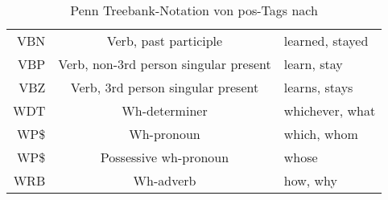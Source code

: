 \begin{table}[h]
\begin{tabular}{ r c l }
    VBN & Verb, past participle & learned, stayed \\
    VBP & Verb, non-3rd person singular present & learn, stay \\
    VBZ & Verb, 3rd person singular present & learns, stays \\
    WDT & Wh-determiner & whichever, what \\
    WP\$ & Wh-pronoun & which, whom \\
    WP\$ & Possessive wh-pronoun & whose \\
    WRB & Wh-adverb & how, why \\
    \bottomrule
  \end{tabular}
  \caption[Penn Treebank-Notation von POS-Tags]{Penn Treebank-Notation von \acs{pos}-Tags nach \citet{penntreebankpos}}
  \label{tab:penntreebankpos}
\end{table}
